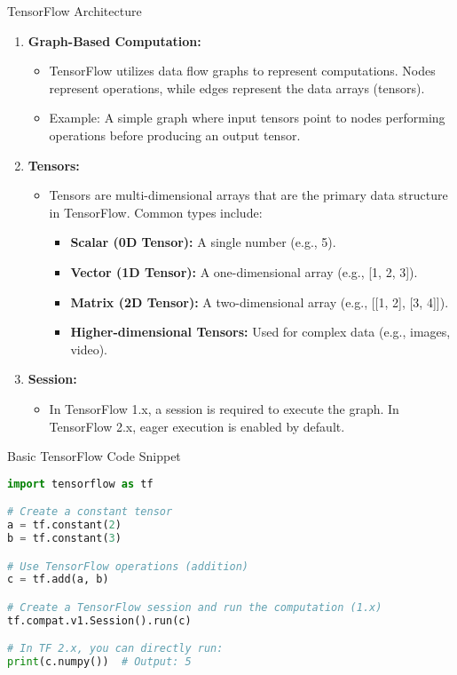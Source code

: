\documentclass[aspectratio=169]{beamer}
\begin{document}
\begin{frame}{TensorFlow Architecture}
    \begin{enumerate}
        \item \textbf{Graph-Based Computation:}
        \begin{itemize}
            \item TensorFlow utilizes data flow graphs to represent computations. Nodes represent operations, while edges represent the data arrays (tensors).
            \item Example: A simple graph where input tensors point to nodes performing operations before producing an output tensor.
        \end{itemize}
        
        \item \textbf{Tensors:}
        \begin{itemize}
            \item Tensors are multi-dimensional arrays that are the primary data structure in TensorFlow. Common types include:
                \begin{itemize}
                    \item \textbf{Scalar (0D Tensor):} A single number (e.g., 5).
                    \item \textbf{Vector (1D Tensor):} A one-dimensional array (e.g., [1, 2, 3]).
                    \item \textbf{Matrix (2D Tensor):} A two-dimensional array (e.g., [[1, 2], [3, 4]]).
                    \item \textbf{Higher-dimensional Tensors:} Used for complex data (e.g., images, video).
                \end{itemize}
        \end{itemize}
        
        \item \textbf{Session:}
        \begin{itemize}
            \item In TensorFlow 1.x, a session is required to execute the graph. In TensorFlow 2.x, eager execution is enabled by default.
        \end{itemize}
    \end{enumerate}
\end{frame}

\begin{frame}[fragile]{Basic TensorFlow Code Snippet}
    \begin{lstlisting}[language=Python]
import tensorflow as tf

# Create a constant tensor
a = tf.constant(2)
b = tf.constant(3)

# Use TensorFlow operations (addition)
c = tf.add(a, b)

# Create a TensorFlow session and run the computation (1.x)
tf.compat.v1.Session().run(c)

# In TF 2.x, you can directly run:
print(c.numpy())  # Output: 5
    \end{lstlisting}
\end{frame}
\end{document}
